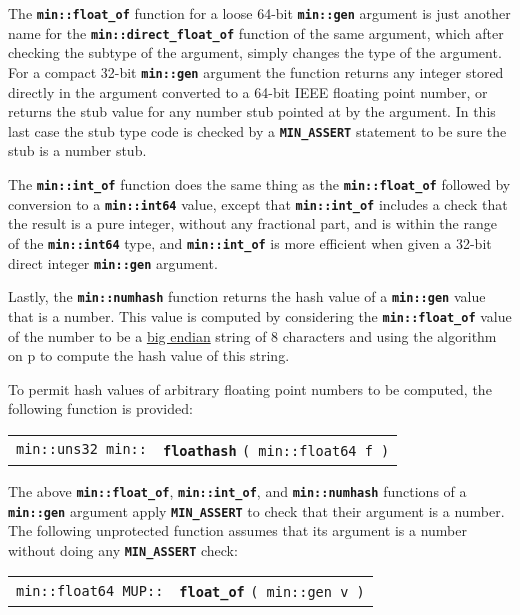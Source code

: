 \documentclass[12pt]{article}
\makeatletter
\newcommand{\TT}[1]{{\tt \bfseries #1}}
\newcommand{\ttindex}[1]{\index{#1@{\tt #1}}}
\newcommand{\pagref}[1]{p\pageref{#1}}
\newenvironment{indpar}[1][0.3in]%
	{\begin{list}{}%
		     {\setlength{\itemsep}{0in}%
		      \setlength{\topsep}{0in}%
		      \setlength{\parsep}{1ex}%
		      \setlength{\labelwidth}{#1}%
		      \setlength{\leftmargin}{#1}%
		      \addtolength{\leftmargin}{\labelsep}}%
	 \item}%
	{\end{list}}
\newcommand{\LABEL}[1]{\label{#1}}
\newcommand{\MINKEY}[1]%
	   {\TT{#1}\ttindex{min::#1}\ttindex{#1}}
\newcommand{\MUPKEY}[1]%
	   {\TT{#1}\ttindex{MUP::#1}\ttindex{#1}}
\makeatother
\begin{document}
The \TT{min::float\_of} function for a loose 64-bit \TT{min::gen}
argument is just another name for the \TT{min::direct\_float\_of} function
of the same argument, which after checking the subtype of the argument,
simply changes the type of the argument.
For a compact 32-bit \TT{min::gen} argument the
function returns any integer stored directly
in the argument converted to a 64-bit IEEE floating point number, or
returns the stub value for any number stub pointed at by the argument.
In this last case the stub type code is checked by a \TT{MIN\_ASSERT}
statement to be sure the stub is a number stub.

The \TT{min::int\_of} function does the same thing as the
\TT{min::float\_of} followed by conversion to a \TT{min::int64} value,
except that \TT{min::int\_of} includes a check that the result
is a pure integer, without any fractional part, and is within the
range of the \TT{min::int64} type, and
\TT{min::int\_of} is more efficient when given a 32-bit direct integer
\TT{min::gen} argument.

Lastly, the \TT{min::numhash} function
returns the hash value of a \TT{min::gen}
value that is a number.  This value is computed by considering
the \TT{min::float\_of} value of the number
to be a \underline{big endian} string of 8 characters and using the algorithm
on \pagref{HASH-ALGORITHM} to compute the hash value of this string.%
\label{NUMBER-HASH-ALGORITHM}

To permit hash values of arbitrary floating point numbers to be computed,
the following function is provided:

\begin{indpar}\begin{tabular}{r@{}l}
\verb|min::uns32 min::| & \MINKEY{floathash} \verb|( min::float64 f )|
\LABEL{MIN::FLOATHASH} \\
\end{tabular}\end{indpar}

The above \TT{min::float\_of}, \TT{min::int\_of}, and \TT{min::numhash}
functions of a \TT{min::gen} argument apply \TT{MIN\_ASSERT} to check
that their argument is a number.  The following unprotected function assumes
that its argument is a number without doing any \TT{MIN\_ASSERT} check:

\begin{indpar}\begin{tabular}{r@{}l}
\verb|min::float64 MUP::| & \MUPKEY{float\_of} \verb|( min::gen v )|
\LABEL{MUP::FLOAT_OF_GEN}
\end{tabular}\end{indpar}
\end{document}
